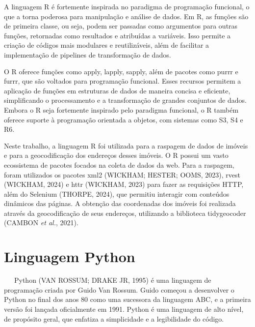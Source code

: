 \documentclass[
  12pt,
  a4paper,
]{scrreprt}
\begin{document}
\vspace{12pt}

A linguagem R é fortemente inspirada no paradigma de programação
funcional, o que a torna poderosa para manipulação e análise de dados.
Em R, as funções são de primeira classe, ou seja, podem ser passadas
como argumentos para outras funções, retornadas como resultados e
atribuídas a variáveis. Isso permite a criação de códigos mais modulares
e reutilizáveis, além de facilitar a implementação de pipelines de
transformação de dados.

\vspace{12pt}

O R oferece funções como apply, lapply, sapply, além de pacotes como
purrr e furrr, que são voltados para programação funcional. Esses
recursos permitem a aplicação de funções em estruturas de dados de
maneira concisa e eficiente, simplificando o processamento e a
transformação de grandes conjuntos de dados. Embora o R seja fortemente
inspirado pelo paradigma funcional, o R também oferece suporte à
programação orientada a objetos, com sistemas como S3, S4 e R6.

\vspace{12pt}

Neste trabalho, a linguagem R foi utilizada para a raspagem de dados de
imóveis e para a geocodificação dos endereços desses imóveis. O R possui
um vasto ecossistema de pacotes focados na coleta de dados da web. Para
a raspagem, foram utilizados os pacotes xml2 (WICKHAM; HESTER; OOMS,
2023), rvest (WICKHAM, 2024) e httr (WICKHAM, 2023) para fazer as
requisições HTTP, além do Selenium (THORPE, 2024), que permitiu
interagir com conteúdos dinâmicos das páginas. A obtenção das
coordenadas dos imóveis foi realizada através da geocodificação de seus
endereços, utilizando a biblioteca tidygeocoder (CAMBON \emph{et al.},
2021).

\section{Linguagem Python}\label{linguagem-python}

~~~Python (VAN ROSSUM; DRAKE JR, 1995) é uma linguagem de programação
criada por Guido Van Rossum. Guido começou a desenvolver o Python no
final dos anos 80 como uma sucessora da linguagem ABC, e a primeira
versão foi lançada oficialmente em 1991. Python é uma linguagem de alto
nível, de propósito geral, que enfatiza a simplicidade e a legibilidade
do código.

\vspace{12pt}
\end{document}
